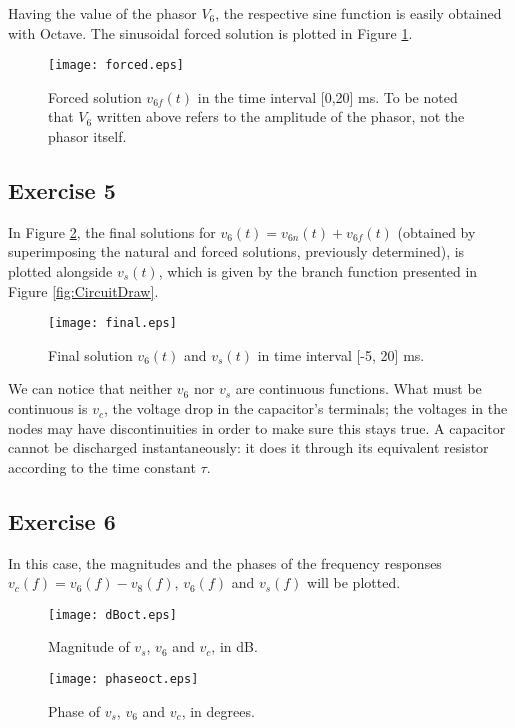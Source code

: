Having the value of the phasor $V_6$, the respective sine function is easily obtained with Octave. The sinusoidal forced solution is plotted in Figure \ref{fig:ForcedSolutionGraph}.

\begin{figure}[H]
  \centering
  \texttt{[image: forced.eps]}
  \caption{Forced solution $v_{6f}(t)$ in the time interval [0,20] ms. To be noted that $V_6$ written above refers to the amplitude of the phasor, not the phasor itself.}
  \label{fig:ForcedSolutionGraph}
\end{figure}

\subsection{Exercise 5} \label{sec:Ex5Theo}

In Figure \ref{fig:final}, the final solutions for $v_6 (t)=v_{6n}(t)+v_{6f}(t)$ (obtained by superimposing the natural and forced solutions, previously determined), is plotted alongside $v_s(t)$, which is given by the branch function presented in Figure \ref{fig:CircuitDraw}.


\begin{figure}[H] \centering
  \texttt{[image: final.eps]}
  \caption{Final solution $v_6(t)$ and $v_s(t)$ in time interval [-5, 20] ms.}
  \label{fig:final}
\end{figure}

We can notice that neither $v_6$ nor $v_s$ are continuous functions. What must be continuous is $v_c$, the voltage drop in the capacitor's terminals; the voltages in the nodes may have discontinuities in order to make sure this stays true. A capacitor cannot be discharged instantaneously: it does it through its equivalent resistor according to the time constant $\tau$.


\subsection{Exercise 6} \label{sec:Ex6Theo}

In this case, the magnitudes and the phases of the frequency responses $v_c(f)=v_6(f)-v_8(f)$, $v_6(f)$ and $v_s(f)$ will be plotted.

\begin{figure}[H] \centering
  \texttt{[image: dBoct.eps]}
  \caption{Magnitude of $v_s$, $v_6$ and $v_c$, in dB.}
  \label{fig:finaloct}
\end{figure}

\begin{figure}[H] \centering
  \texttt{[image: phaseoct.eps]}
  \caption{Phase of $v_s$, $v_6$ and $v_c$, in degrees.}
  \label{fig:finaloct}
\end{figure}

